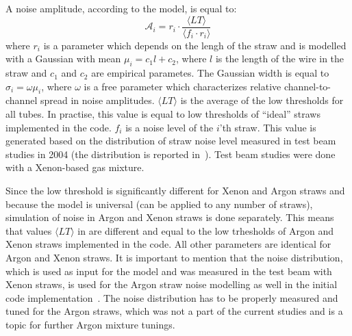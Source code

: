 
A noise amplitude, according to the model, is equal to:
\begin{equation}
 \mathcal A_{i} = r_{i} \cdot \dfrac{\langle LT \rangle}{\langle f_i \cdot r_i \rangle}
 \label{eq:ampl_noise}
\end{equation}
where $r_{i}$ is a parameter which depends on the lengh of the straw and is modelled with a Gaussian with mean $\mu_i = c_1 l + c_2$, 
where $l$ is the length of the wire in the straw and $c_1$ and $c_2$ are empirical parametes. 
The Gaussian width is equal to $\sigma_i = \omega \mu_i$, where $\omega$ is a free parameter which characterizes
relative channel-to-channel spread in noise amplitudes.
$\langle LT \rangle$ is the average of the low thresholds for all tubes. In practise, this value is equal to low thresholds of ``ideal'' straws 
implemented in the code.
$f_{i}$ is a noise level of the $i$'th straw. This value is generated based on the distribution of straw noise level measured in test beam studies in 2004 
(the distribution is reported in~\cite{kittelmann_thesis}). Test beam studies were done with a Xenon-based gas mixture. 

Since the low threshold is significantly different for Xenon and Argon straws and because the model is universal (can be applied to any number of straws), 
simulation of noise in Argon and Xenon straws is done separately. This means that values $\langle LT \rangle$ in  are 
different and equal to the low trhesholds of Argon and Xenon straws implemented in the code. All other parameters are identical for Argon and Xenon straws.
It is important to mention that the noise distribution, which is used as input for the model and was measured in the test beam with Xenon straws,
is used for the Argon straw noise modelling as well in the initial code implementation~\cite{anatoli_private_communication}. 
The noise distribution has to be properly measured and tuned for the Argon straws, which
was not a part of the current studies and is a topic for further Argon mixture tunings.

